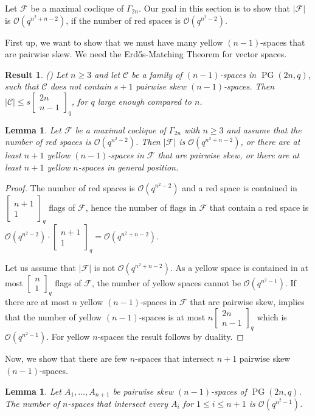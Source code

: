 \documentclass[11pt, oneside, a4paper]{article}
\newtheorem{lemma}[thm]{Lemma}
\newtheorem{result}[thm]{Result}
\newcommand{\EKR}{\mathcal{F}}
\newcommand{\OO}{\mathcal{O}}
\newcommand{\Gauss}[2]{{\begin{bmatrix} #1 \\ #2 \end{bmatrix}_q}}
\DeclareMathOperator{\PG}{PG}
\begin{document}
Let $\EKR$ be a maximal coclique of $\Gamma_{2n}$.
Our goal in this section is to show that $|\EKR|$ is $\OO(q^{n^2+n-2})$, if the number of red spaces is $\OO(q^{n^2-2})$.

First up, we want to show that we must have many yellow $(n-1)$-spaces that are pairwise skew. We need the Erd\H{o}s-Matching Theorem for vector spaces.

\begin{result} (\cite{Ihringer_EM}) \label{R: EM for vector spaces}
Let $n\geq 3$ and let $\mathcal{C}$ be a family of $(n-1)$-spaces in $\PG(2n,q)$, such that $\mathcal{C}$ does not contain $s+1$ pairwise skew $(n-1)$-spaces. Then $|\mathcal{C}|\leq s \Gauss{2n}{n-1}$, for $q$ large enough compared to $n$.
\end{result}

\begin{lemma} \label{L: many yellow pw skew}
     Let $\EKR$ be a maximal coclique of $\Gamma_{2n}$ with $n\geq 3$ and assume that the number of red spaces is $\OO(q^{n^2-2})$. Then $|\EKR|$ is $\OO(q^{n^2+n-2})$, or there are at least $n+1$ yellow $(n-1)$-spaces in $\EKR$ that are pairwise skew, or there are at least $n+1$ yellow $n$-spaces in general position.
\end{lemma}

\begin{proof}
    The number of red spaces is $\OO(q^{n^2-2})$ and a red space is contained in $\Gauss{n+1}{1}$ flags of $\EKR$, hence the number of flags in $\EKR$ that contain a red space is $\OO(q^{n^2-2})\cdot \Gauss{n+1}{1}=\OO(q^{n^2+n-2})$. 

    Let us assume that $|\EKR|$ is not $\OO(q^{n^2+n-2})$. 
    As a yellow space is contained in at most $\Gauss{n}{1}$ flags of $\EKR$, the number of yellow spaces cannot be $\OO(q^{n^2-1})$. If there are at most $n$ yellow $(n-1)$-spaces in $\EKR$ that are pairwise skew,  implies that the number of yellow $(n-1)$-spaces is at most $n \Gauss{2n}{n-1}$ which is $\mathcal{O}(q^{n^2-1})$. For yellow $n$-spaces the result follows by duality.
\end{proof}



Now, we show that there are few $n$-spaces that intersect $n+1$ pairwise skew $(n-1)$-spaces.

\begin{lemma} \label{L: few that meet all}
 Let $A_1,\ldots,A_{n+1}$ be pairwise skew $(n-1)$-spaces of $\PG(2n,q)$. The number of $n$-spaces that intersect every $A_i$ for $1\leq i\leq n+1$ is $\OO(q^{n^2-1})$.
\end{lemma}
\end{document}
